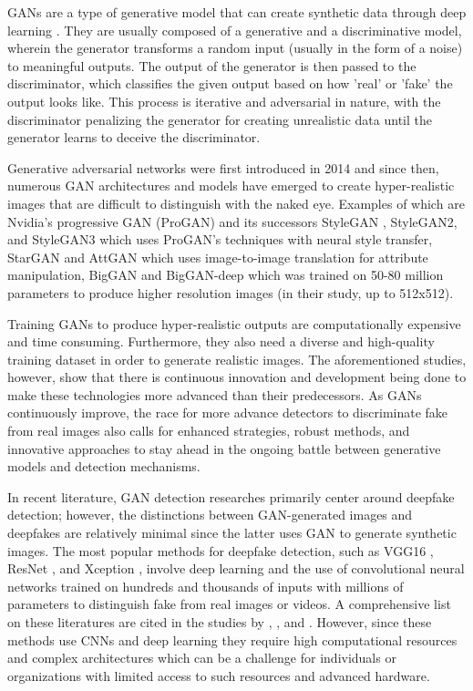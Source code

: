 \documentclass{icsthesis}
\begin{document}
\begin{mainmatter}
\par GANs are a type of generative model that can create synthetic data through deep learning \citep{google-ML}. They are usually composed of a generative and a discriminative model, wherein the generator transforms a random input (usually in the form of a noise) to meaningful outputs. The output of the generator is then passed to the discriminator, which classifies the given output based on how 'real' or 'fake' the output looks like. This process is iterative and adversarial in nature, with the discriminator penalizing the generator for creating unrealistic data until the generator learns to deceive the discriminator. 

\par Generative adversarial networks were first introduced in 2014 \citep{GAN-2014} and since then, numerous GAN architectures and models have emerged to create hyper-realistic images that are difficult to distinguish with the naked eye. Examples of which are Nvidia's progressive GAN (ProGAN) \citep{ProGAN} and its successors StyleGAN \citep{StyleGAN-2018}, StyleGAN2, and StyleGAN3 which uses ProGAN's techniques with neural style transfer, StarGAN \citep{StarGAN-2018} and AttGAN \citep{AttGAN} which uses image-to-image translation for attribute manipulation, BigGAN and BigGAN-deep \citep{BigGAN} which was trained on 50-80 million parameters to produce higher resolution images (in their study, up to 512x512).  

\par Training GANs to produce hyper-realistic outputs are computationally expensive and time consuming. Furthermore, they also need a diverse and high-quality training dataset in order to generate realistic images. The aforementioned studies, however, show that there is continuous innovation and development being done to make these technologies more advanced than their predecessors. As GANs continuously improve, the race for more advance detectors to discriminate fake from real images also calls for enhanced strategies, robust methods, and innovative approaches to stay ahead in the ongoing battle between generative models and detection mechanisms. 

\par In recent literature, GAN detection researches primarily center around deepfake detection; however, the distinctions between GAN-generated images and deepfakes are relatively minimal since the latter uses GAN to generate synthetic images. The most popular methods for deepfake detection, such as VGG16 \citep{vgg16}, ResNet \citep{resnet}, and Xception \citep{xception}, involve deep learning and the use of convolutional neural networks trained on hundreds and thousands of inputs with millions of parameters to distinguish fake from real images or videos. A comprehensive list on these literatures are cited in the studies by \cite{deeplearning-litrev}, \cite{deeplearning-litrev2}, and \cite{deeplearning-litrev3}. However, since these methods use CNNs and deep learning they require high computational resources and complex architectures which can be a challenge for individuals or organizations with limited access to such resources and advanced hardware. 


\end{mainmatter}
\end{document}
